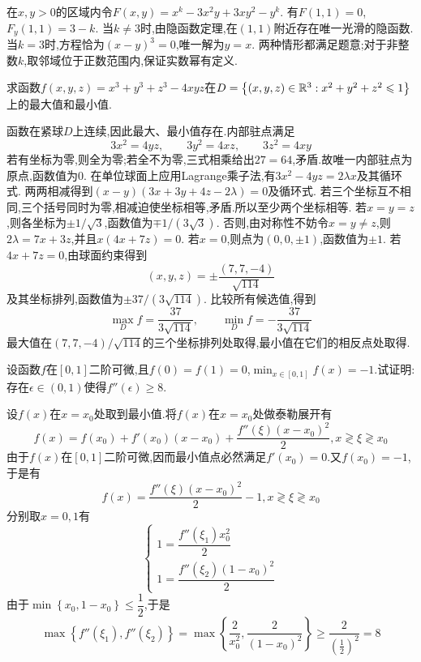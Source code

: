\documentclass{ctexart}
\begin{document}
\begin{solution}
在$x,y>0$的区域内令$F(x,y)=x^k-3x^2y+3xy^2-y^k$.
有$F(1,1)=0$, $F_y(1,1)=3-k$.
当$k\neq3$时,由隐函数定理,在$(1,1)$附近存在唯一光滑的隐函数.
当$k=3$时,方程恰为$(x-y)^3=0$,唯一解为$y=x$.
两种情形都满足题意;对于非整数$k$,取邻域位于正数范围内,保证实数幂有定义.
\end{solution}
\begin{problem}[8.(15\songti{分})]
求函数$f(x,y,z)=x^3+y^3+z^3-4xyz$在$D=\left\{(x,y,z)\in\mathbb{R}^3:x^2+y^2+z^2\leqslant1\right\}$上的最大值和最小值.
\end{problem}
\begin{solution}
函数在紧球$D$上连续,因此最大、最小值存在.内部驻点满足
\[3x^2=4yz,\qquad3y^2=4xz,\qquad3z^2=4xy\]
若有坐标为零,则全为零;若全不为零,三式相乘给出$27=64$,矛盾.故唯一内部驻点为原点,函数值为$0$.
在单位球面上应用Lagrange乘子法,有$3x^2-4yz=2\lambda x$及其循环式.
两两相减得到$(x-y)(3x+3y+4z-2\lambda)=0$及循环式.
若三个坐标互不相同,三个括号同时为零,相减迫使坐标相等,矛盾.所以至少两个坐标相等.
若$x=y=z$,则各坐标为$\pm1/\sqrt3$,函数值为$\mp1/(3\sqrt3)$.
否则,由对称性不妨令$x=y\neq z$,则$2\lambda=7x+3z$,并且$x(4x+7z)=0$.
若$x=0$,则点为$(0,0,\pm1)$,函数值为$\pm1$.
若$4x+7z=0$,由球面约束得到
\[(x,y,z)=\pm\dfrac{(7,7,-4)}{\sqrt{114}}\]
及其坐标排列,函数值为$\pm37/(3\sqrt{114})$.
比较所有候选值,得到
\[\max_D f=\dfrac{37}{3\sqrt{114}},\qquad\min_D f=-\dfrac{37}{3\sqrt{114}}\]
最大值在$(7,7,-4)/\sqrt{114}$的三个坐标排列处取得,最小值在它们的相反点处取得.
\end{solution}
\begin{problem}[9.(10\songti{分})]
设函数$f$在$[0,1]$二阶可微,且$f(0)=f(1)=0$,$\displaystyle\min_{x\in[0,1]}f(x)=-1$.试证明:存在$\epsilon\in(0,1)$使得$f''(\epsilon)\geqslant8$.
\end{problem}
\begin{solution}
设$f(x)$在$x=x_0$处取到最小值.将$f(x)$在$x=x_0$处做泰勒展开有
    \[f(x)=f(x_0)+f'(x_0)(x-x_0)+\dfrac{f''(\xi)(x-x_0)^2}{2},x\gtrless\xi\gtrless x_0\]
    由于$f(x)$在$[0,1]$二阶可微,因而最小值点必然满足$f'(x_0)=0$.又$f(x_0)=-1$,于是有
    \[f(x)=\dfrac{f''(\xi)(x-x_0)^2}{2}-1,x\gtrless\xi\gtrless x_0\]
    分别取$x=0,1$有
    \[\left\{\begin{array}{l}
        1=\dfrac{f''(\xi_1)x_0^2}{2}\\
        1=\dfrac{f''(\xi_2)(1-x_0)^2}{2}
    \end{array}\right.\]
    由于$\min\left\{x_0,1-x_0\right\}\leqslant\dfrac12$,于是
    \[\max\left\{f''(\xi_1),f''(\xi_2)\right\}=\max\left\{\dfrac{2}{x_0^2},\dfrac{2}{(1-x_0)^2}\right\}\geqslant\dfrac{2}{\left(\frac12\right)^2}=8\]
\end{solution}
\end{document}
